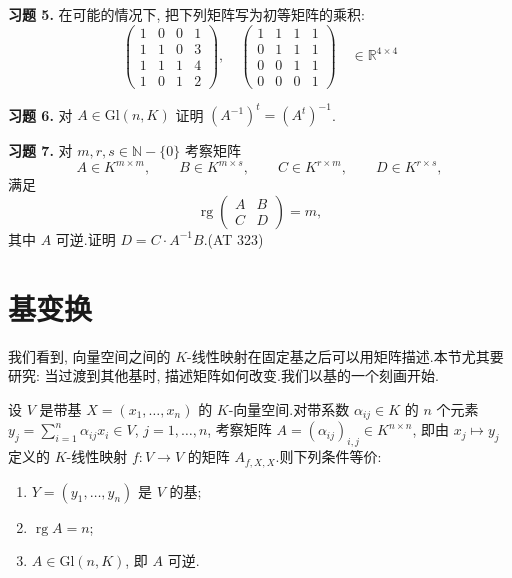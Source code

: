 \noindent\textbf{习题 5.} 在可能的情况下, 把下列矩阵写为初等矩阵的乘积:
\[
\begin{pmatrix}
1 & 0 & 0 & 1 \\
1 & 1 & 0 & 3 \\
1 & 1 & 1 & 4 \\
1 & 0 & 1 & 2
\end{pmatrix},
\quad
\begin{pmatrix}
1 & 1 & 1 & 1 \\
0 & 1 & 1 & 1 \\
0 & 0 & 1 & 1 \\
0 & 0 & 0 & 1
\end{pmatrix} \quad \in \mathbb{R}^{4 \times 4}
\]

\noindent\textbf{习题 6.} 对 $A \in \mathrm{Gl}(n, K)$ 证明 $(A^{-1})^t = (A^t)^{-1}$.

\noindent\textbf{习题 7.} 对 $m, r, s \in \mathbb{N} - \{0\}$ 考察矩阵
\[
A \in K^{m \times m}, \qquad B \in K^{m \times s}, \qquad C \in K^{r \times m}, \qquad D \in K^{r \times s},
\]
满足
\[
\operatorname{rg} \begin{pmatrix} A & B \\ C & D \end{pmatrix} = m,
\]
其中 $A$ 可逆.证明 $D = C \cdot A^{-1}B$.(AT 323)

\section{基变换}\label{sec:3.4}

我们看到, 向量空间之间的 $K$-线性映射在固定基之后可以用矩阵描述.本节尤其要研究: 当过渡到其他基时, 描述矩阵如何改变.我们以基的一个刻画开始.

\begin{remark}\label{rem:3.4.1}
设 $V$ 是带基 $X = (x_1, \ldots, x_n)$ 的 $K$-向量空间.对带系数 $\alpha_{ij} \in K$ 的 $n$ 个元素 $y_j = \sum_{i = 1}^{n}\alpha_{ij}x_i \in V$, $j = 1, \ldots, n$, 考察矩阵 $A = (\alpha_{ij})_{i, j} \in K^{n \times n}$, 即由 $x_j \longmapsto y_j$ 定义的 $K$-线性映射 $f \colon V \longrightarrow V$ 的矩阵 $A_{f, X, X}$.则下列条件等价:
\begin{enumerate}
\item[(i)] $Y = (y_1, \ldots, y_n)$ 是 $V$ 的基;
\item[(ii)] $\operatorname{rg} A = n$;
\item[(iii)] $A \in \mathrm{Gl}(n, K)$, 即 $A$ 可逆.
\end{enumerate}
\end{remark}

